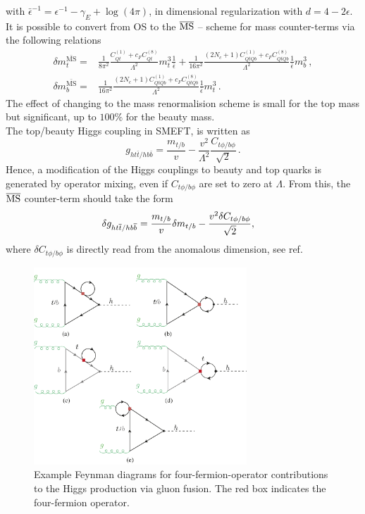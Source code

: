 	with $\bar{\epsilon}^{-1} = \epsilon^{-1}- \gamma_E +\log(4 \pi)$, in dimensional regularization with $d=4-2\epsilon$. 
	It is possible to convert from OS to the $\MSbar$ -- scheme for mass counter-terms via the following relations
	\begin{align}
		\delta m_t^{\bar{\text{MS}}} =&\frac{1}{8 \pi^2} \frac{C_{Qt}^{(1)}+c_F C_{Qt}^{(8)}}{\Lambda^2}m_t^3\frac{1}{\bar{\epsilon}}+ \frac{1}{16 \pi^2}  \frac{(2 N_c+1) C_{QtQb}^{(1)}+c_F C_{QtQb}^{(8)}}{\Lambda^2}   \frac{1}{\bar{\epsilon}}  m_b^3\,,  \\
		\delta m_b^{\bar{\text{MS}}}=&\frac{1}{16 \pi^2} \frac{(2 N_c+1)C_{QtQb}^{(1)}+c_F C_{QtQb}^{(8)}}{\Lambda^2}\frac{1}{\bar{\epsilon}} m_t^3\,.
	\end{align} 
	The effect of changing to the mass renormalision  scheme is small for the top mass but  significant, up to $100\%$ for the beauty mass. \\
	The top/beauty Higgs coupling in SMEFT, is written as
	\begin{equation}
		g_{ht\bar{t}/hb\bar{b}}=\frac{m_{t/b}}{v}-\frac{v^2}{\Lambda^2}\frac{C_{t\phi/b\phi}}{\sqrt{2}}\,.
	\end{equation}
	Hence, a modification of the Higgs couplings to beauty and top quarks is generated by operator mixing, even if $C_{t\phi/b\phi}$ are set to zero at $\Lambda$. From this, the $\MSbar$ counter-term should take the form 
	\begin{align}
		\delta	g_{ht\bar{t}/hb\bar{b}} &=  {m_{t/b}\over v} \delta{m_{t/b}} -{v^2 \delta{C_{t\phi/b\phi}}\over \sqrt{2} },
	\end{align}
	where $\delta{C_{t\phi/b\phi}}$ is directly read from the anomalous dimension, see ref.~\cite{Alonso:2013hga}
	\begin{figure}[h!]
		\begin{center}
			\includegraphics[width=8cm]{fig/ggF-4F_NLO.pdf}
			\caption{Example Feynman diagrams for four-fermion-operator contributions to the Higgs production via gluon fusion. The red box indicates the four-fermion operator.\label{fig:ggh} }
		\end{center}
		\vspace{-1.5 cm}
	\end{figure}
